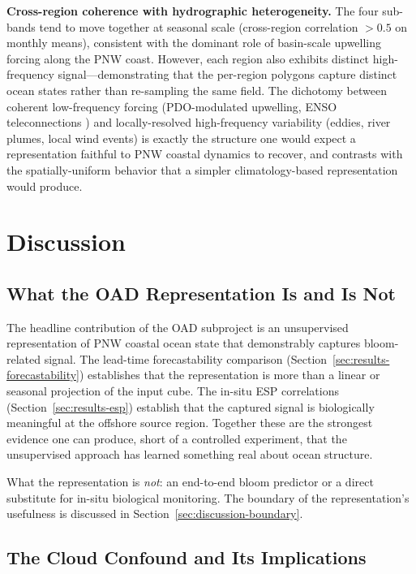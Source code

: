 \documentclass[toxins,article,submit,moreauthors]{Definitions/mdpi}
\begin{document}
\textbf{Cross-region coherence with hydrographic heterogeneity.}
The four sub-bands tend to move together at seasonal scale (cross-region correlation $> 0.5$ on monthly means), consistent with the dominant role of basin-scale upwelling forcing along the PNW coast. However, each region also exhibits distinct high-frequency signal---demonstrating that the per-region polygons capture distinct ocean states rather than re-sampling the same field. The dichotomy between coherent low-frequency forcing (PDO-modulated upwelling, ENSO teleconnections \cite{Jacox2018}) and locally-resolved high-frequency variability (eddies, river plumes, local wind events) is exactly the structure one would expect a representation faithful to PNW coastal dynamics to recover, and contrasts with the spatially-uniform behavior that a simpler climatology-based representation would produce.

\section{Discussion}
\label{sec:discussion}

\subsection{What the OAD Representation Is and Is Not}

The headline contribution of the OAD subproject is an unsupervised representation of PNW coastal ocean state that demonstrably captures bloom-related signal. The lead-time forecastability comparison (Section~\ref{sec:results-forecastability}) establishes that the representation is more than a linear or seasonal projection of the input cube. The in-situ ESP correlations (Section~\ref{sec:results-esp}) establish that the captured signal is biologically meaningful at the offshore source region. Together these are the strongest evidence one can produce, short of a controlled experiment, that the unsupervised approach has learned something real about ocean structure.

What the representation is \emph{not}: an end-to-end bloom predictor or a direct substitute for in-situ biological monitoring. The boundary of the representation's usefulness is discussed in Section~\ref{sec:discussion-boundary}.

\subsection{The Cloud Confound and Its Implications}
\end{document}
